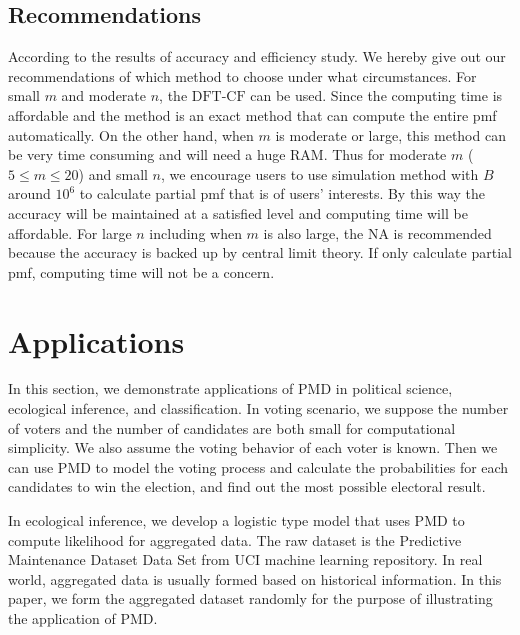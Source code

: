 \documentclass[12pt]{article}
\newcommand{\PMD}{\textrm{PMD}}
\newcommand{\NA}{{\textrm{NA}}}
\newcommand{\dft}{{\textrm{DFT-CF}}}
\begin{document}
\subsection{Recommendations}
According to the results of accuracy and efficiency study. We hereby give out our recommendations of which method to choose under what circumstances. For small $m$ and moderate $n$, the $\dft$ can be used. Since the computing time is affordable and the method is an exact method that can compute the entire pmf automatically. On the other hand, when $m$ is moderate or large, this method can be very time consuming and will need a huge RAM. Thus for moderate $m$ ($5 \leq m \leq 20$) and small $n$, we encourage users to use simulation method with $B$ around $10^6$ to calculate partial pmf that is of users' interests. By this way the accuracy will be maintained at a satisfied level and computing time will be affordable. For large $n$ including when $m$ is also large, the $\NA$ is recommended because the accuracy is backed up by central limit theory. If only calculate partial pmf, computing time will not be a concern.

\section{Applications}\label{sec:applications}

In this section, we demonstrate applications of $\PMD$ in political science, ecological inference, and classification. In voting scenario, we suppose the number of voters and the number of candidates are both small for computational simplicity. We also assume the voting behavior of each voter is known. Then we can use $\PMD$ to model the voting process and calculate the probabilities for each candidates to win the election, and find out the most possible electoral result. 
 
In ecological inference, we develop a logistic type model that uses $\PMD$ to compute likelihood for aggregated data. The raw dataset is the Predictive Maintenance Dataset Data Set \cite{Dua:2019} from UCI machine learning repository. In real world, aggregated data is usually formed based on historical information. In this paper, we form the aggregated dataset randomly for the purpose of illustrating the application of $\PMD$.
\end{document}
